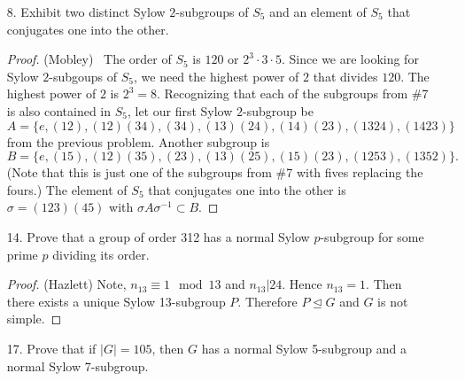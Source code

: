 \documentclass[10pt]{article}
\begin{document}
\begin{itemize}
\begin{proof}
Finally notice that \begin{eqnarray*}
(2\,3\,4)(1\,4\,2\,3)(2\,4\,3)=(1\,2\,3\,4) & \mbox{and} & (2\,3\,4)(1\,4)(2\,3)(2\,4\,3)=(1\,2)(3\,4).\end{eqnarray*}
And so $(2\,3\,4)\langle(1\,4\,2\,3),\,(1\,4)(2\,3)\rangle(2\,3\,4)^{-1}=\langle(1\,2\,3\,4),\,(1\,2)(3\,4)\rangle$.

We've shown that powers of $(2\,3\,4)$ conjugate the elements of
$Syl_{2}(S_{4})$ into other elements of $Syl_{2}(S_{4})$, and that
every element of $Syl_{2}(S_{4})$ can be taken into any other element
of $Syl_{2}(S_{4})$ by conjugation by $(2\,3\,4)$.\\
\end{proof}

\item[8.]  Exhibit two distinct Sylow $2$-subgroups of $S_5$ and an element of $S_5$ that conjugates one into the other.
 
\begin{proof}(Mobley) \ The order of $S_5$ is $120$ or $2^3 \cdot 3 \cdot 5$.  Since we are looking for Sylow 
$2$-subgoups of $S_5$, we need the highest power of $2$ that divides $120$.  The highest power of $2$ is $2^3=8$.  
Recognizing that each of the subgroups from \#7 is also contained in $S_5$, let our first Sylow $2$-subgroup be 
$$A=\lbrace e, (1 2), (1 2)(3 4), (3 4), (1 3)(2 4), (1 4)(2 3),(1 3 2 4), (1 4 2 3)\rbrace$$  
from the previous problem.  Another subgroup is 
$$B=\lbrace e, (1 5), (1 2)(3 5), (2 3), (1 3)(2 5), (1 5)(2 3),(1 2 5 3), (1 3 5 2)\rbrace.$$  
(Note that this is just one of the subgroups from \#7 with fives replacing the fours.)  The element of $S_5$ that
conjugates one into the other is $\sigma = (1 2 3)(4 5)$ with $\sigma A \sigma^{-1} \subset B$.

\end{proof}


\item [14.] Prove that a group of order 312 has a normal Sylow $p$-subgroup for some prime $p$ dividing its order.
\begin{proof}(Hazlett)
Note, $n_{13} \equiv 1 \mod 13$ and $n_{13} |24$.  Hence $n_{13} = 1$.  Then there exists a unique Sylow 13-subgroup $P$.  Therefore $P \unlhd G$ and $G$ is not simple.
\end{proof}

\item[17.] Prove that if $|G| = 105$, then $G$ has a normal Sylow 5-subgroup 
and a normal Sylow 7-subgroup.


\end{itemize}
\end{document}
